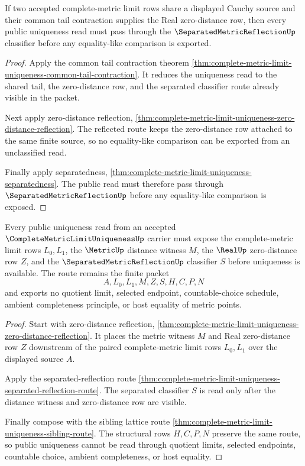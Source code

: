 \begin{theorem}
\label{thm:complete-metric-limit-uniqueness-common-tail-classifier}
If two accepted complete-metric limit rows share a displayed Cauchy source and their common tail contraction supplies the Real zero-distance row, then every public uniqueness read must pass through the $\SeparatedMetricReflectionUp$ classifier before any equality-like comparison is exported.
\end{theorem}
\begin{proof}
Apply the common tail contraction theorem \autoref{thm:complete-metric-limit-uniqueness-common-tail-contraction}. It reduces the uniqueness read to the shared tail, the zero-distance row, and the separated classifier route already visible in the packet.

Next apply zero-distance reflection, \autoref{thm:complete-metric-limit-uniqueness-zero-distance-reflection}. The reflected route keeps the zero-distance row attached to the same finite source, so no equality-like comparison can be exported from an unclassified read.

Finally apply separatedness, \autoref{thm:complete-metric-limit-uniqueness-separatedness}. The public read must therefore pass through $\SeparatedMetricReflectionUp$ before any equality-like comparison is exposed.
\end{proof}

\begin{theorem}\label{thm:complete-metric-limit-uniqueness-separated-zero-distance-route}
Every public uniqueness read from an accepted $\CompleteMetricLimitUniquenessUp$ carrier must expose the complete-metric limit rows $L_{0},L_{1}$, the $\MetricUp$ distance witness $M$, the $\RealUp$ zero-distance row $Z$, and the $\SeparatedMetricReflectionUp$ classifier $S$ before uniqueness is available. The route remains the finite packet
$$
A,L_{0},L_{1},M,Z,S,H,C,P,N
$$
and exports no quotient limit, selected endpoint, countable-choice schedule, ambient completeness principle, or host equality of metric points.
\end{theorem}
\begin{proof}
Start with zero-distance reflection, \autoref{thm:complete-metric-limit-uniqueness-zero-distance-reflection}. It places the metric witness $M$ and Real zero-distance row $Z$ downstream of the paired complete-metric limit rows $L_{0},L_{1}$ over the displayed source $A$.

Apply the separated-reflection route \autoref{thm:complete-metric-limit-uniqueness-separated-reflection-route}. The separated classifier $S$ is read only after the distance witness and zero-distance row are visible.

Finally compose with the sibling lattice route \autoref{thm:complete-metric-limit-uniqueness-sibling-route}. The structural rows $H,C,P,N$ preserve the same route, so public uniqueness cannot be read through quotient limits, selected endpoints, countable choice, ambient completeness, or host equality.
\end{proof}

